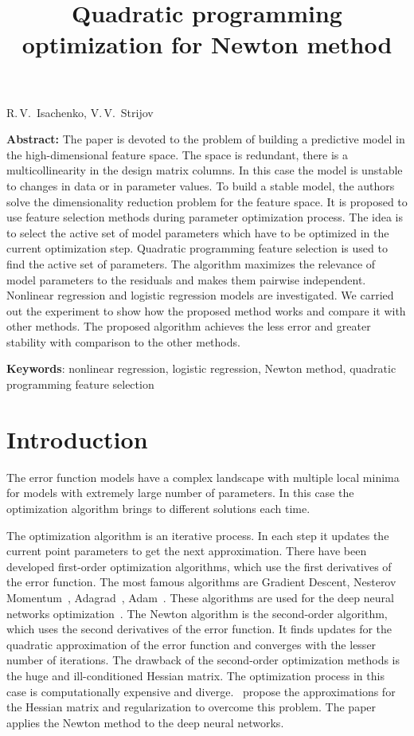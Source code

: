 \documentclass[a4paper,12pt]{article}
\theoremstyle{plain} %
\theoremstyle{definition} %
\theoremstyle{remark} %
\begin{document}
		
		\title
	{Quadratic programming optimization for Newton method}
	\date{}
	\maketitle
	\begin{center}
		R.\,V.~Isachenko,
		V.\,V.~Strijov
	\end{center}
	\textbf{Abstract:} 
	The paper is devoted to the problem of building a predictive model in the high-dimensional feature space.
	The space is redundant, there is a multicollinearity in the design matrix columns.
	In this case the model is unstable to changes in data or in parameter values. 
	To build a stable model, the authors solve the dimensionality reduction problem for the feature space.
	It is proposed to use feature selection methods during parameter optimization process.
	The idea is to select the active set of model parameters which have to be optimized in the current optimization step.
	Quadratic programming feature selection is used to find the active set of parameters. 
	The algorithm maximizes the relevance of model parameters to the residuals and makes them pairwise independent. 
	Nonlinear regression and logistic regression models are investigated. 
	We carried out the experiment to show how the proposed method works and compare it with other methods. 
	The proposed algorithm achieves the less error and greater stability with comparison to the other methods.
	
	\bigskip
	\textbf{Keywords}: nonlinear regression, logistic regression, Newton method, quadratic programming feature selection
	
	\section*{Introduction}
	The error function models have a complex landscape with multiple local minima for models with extremely large number of parameters. 
	In this case the optimization algorithm brings to different solutions each time.
	
	The optimization algorithm is an iterative process. 
	In each step it updates the current point parameters to get the next approximation.
	There have been developed first-order optimization algorithms, which use the first derivatives of the error function. 
	The most famous algorithms are Gradient Descent, Nesterov Momentum~\cite{nesterov1983momentum}, Adagrad~\cite{duchi2011adagrad}, Adam~\cite{kingma2014adam}. 
	These algorithms are used for the deep neural networks optimization~\cite{goodfellow2016deeplearningbook}. 
	The Newton algorithm is the second-order algorithm, which uses the second derivatives of the error function. 
	It finds updates for the quadratic approximation of the error function and converges with the lesser number of iterations.
	The drawback of the second-order optimization methods is the huge and ill-conditioned Hessian matrix. 
	The optimization process in this case is computationally expensive and diverge. 
	\cite{avriel2003nonlinear,blaschke1997convergence}~propose the approximations for the Hessian matrix and regularization to overcome this problem.
	The paper~\cite{botev2017newtondeeplearning} applies the Newton method to the deep neural networks.
	
\end{document}
